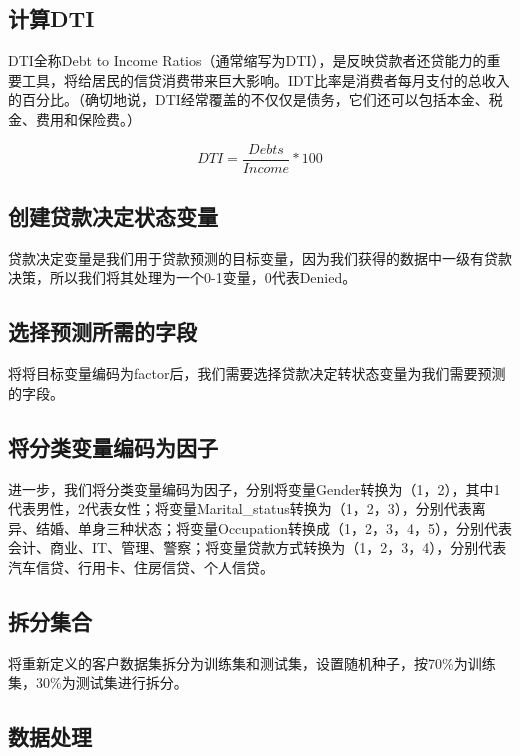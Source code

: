 \documentclass[UTF8]{ctexart}
\begin{document}
\subsection{计算DTI}

DTI全称Debt to Income Ratios（通常缩写为DTI），是反映贷款者还贷能力的重要工具，将给居民的信贷消费带来巨大影响。IDT比率是消费者每月支付的总收入的百分比。（确切地说，DTI经常覆盖的不仅仅是债务，它们还可以包括本金、税金、费用和保险费。）

\begin{equation}
	DTI = \frac{Debts}{Income} *100
\end{equation}

\subsection{创建贷款决定状态变量}

贷款决定变量是我们用于贷款预测的目标变量，因为我们获得的数据中一级有贷款决策，所以我们将其处理为一个0-1变量，0代表Denied。

\subsection{选择预测所需的字段}

将将目标变量编码为factor后，我们需要选择贷款决定转状态变量为我们需要预测的字段。

\subsection{将分类变量编码为因子}

进一步，我们将分类变量编码为因子，分别将变量Gender转换为（1，2），其中1代表男性，2代表女性；将变量Marital\_status转换为（1，2，3），分别代表离异、结婚、单身三种状态；将变量Occupation转换成（1，2，3，4，5），分别代表会计、商业、IT、管理、警察；将变量贷款方式转换为（1，2，3，4），分别代表汽车信贷、行用卡、住房信贷、个人信贷。


\subsection{拆分集合}

将重新定义的客户数据集拆分为训练集和测试集，设置随机种子，按70\%为训练集，30\%为测试集进行拆分。

\subsection{数据处理}
\end{document}
